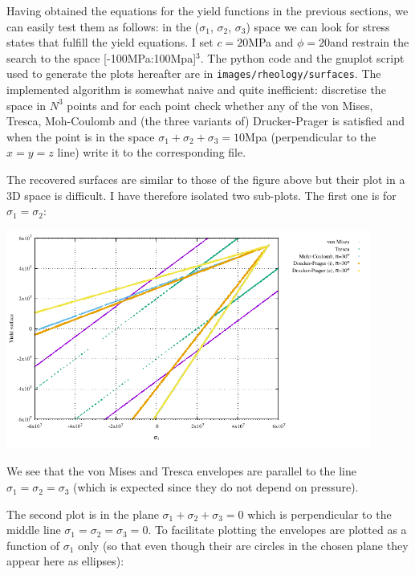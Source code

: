 Having obtained the equations for the yield functions in the previous sections, we can easily test
them as follows: in the ($\sigma_1$, $\sigma_2$, $\sigma_3$) space we can look for stress states 
that fulfill the yield equations. I set $c=20$MPa and $\phi=20$\degree and restrain 
the search to the space [-100MPa:100Mpa]$^3$.
The python code and the gnuplot script used to generate the plots hereafter 
are in {\tt images/rheology/surfaces}. The implemented algorithm is somewhat  
naive and quite inefficient: discretise the space in $N^3$ points and for each point 
check whether any of the von Mises, Tresca, Moh-Coulomb and (the three variants of) Drucker-Prager 
is satisfied and when the point is in the space $\sigma_1+\sigma_2+\sigma_3=10$Mpa 
(perpendicular to the $x=y=z$ line) write it to the corresponding file.

The recovered surfaces are similar to those of the figure above but their plot in a 3D space is difficult.
I have therefore isolated two sub-plots. 
The first one is for $\sigma_1=\sigma_2$:

\begin{center}
\includegraphics[width=12cm]{images/rheology/surfaces/surfaces_xy.pdf}
\end{center}
We see that the von Mises and Tresca envelopes are parallel to the line $\sigma_1=\sigma_2=\sigma_3$ (which 
is expected since they do not depend on pressure).

The second plot is in the plane $\sigma_1+\sigma_2+\sigma_3=0$ which is perpendicular to the middle line 
$\sigma_1=\sigma_2=\sigma_3=0$. To facilitate plotting the envelopes are plotted as a function of $\sigma_1$ only (so that even though their are circles in the chosen plane they appear here as ellipses):

